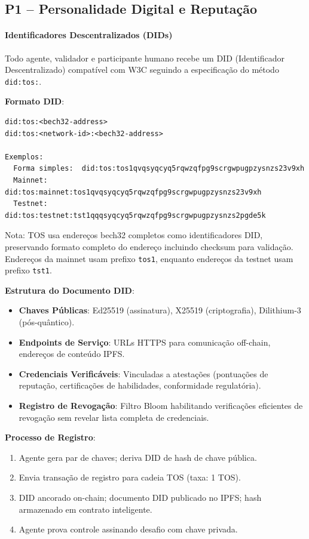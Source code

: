 \documentclass[11pt]{article}
\begin{document}
\subsection{P1 -- Personalidade Digital e Reputação}
\label{sec:pillar-identity}

\paragraph{Identificadores Descentralizados (DIDs)}
Todo agente, validador e participante humano recebe um DID (Identificador Descentralizado) compatível com W3C seguindo a especificação do método \texttt{did:tos:}.

\textbf{Formato DID}:
\begin{verbatim}
did:tos:<bech32-address>
did:tos:<network-id>:<bech32-address>

Exemplos:
  Forma simples:  did:tos:tos1qvqsyqcyq5rqwzqfpg9scrgwpugpzysnzs23v9xh
  Mainnet:        did:tos:mainnet:tos1qvqsyqcyq5rqwzqfpg9scrgwpugpzysnzs23v9xh
  Testnet:        did:tos:testnet:tst1qqqsyqcyq5rqwzqfpg9scrgwpugpzysnzs2pgde5k
\end{verbatim}
Nota: TOS usa endereços bech32 completos como identificadores DID, preservando formato completo do endereço incluindo checksum para validação. Endereços da mainnet usam prefixo \texttt{tos1}, enquanto endereços da testnet usam prefixo \texttt{tst1}.

\textbf{Estrutura do Documento DID}:
\begin{itemize}[noitemsep]
  \item \textbf{Chaves Públicas}: Ed25519 (assinatura), X25519 (criptografia), Dilithium-3 (pós-quântico).
  \item \textbf{Endpoints de Serviço}: URLs HTTPS para comunicação off-chain, endereços de conteúdo IPFS.
  \item \textbf{Credenciais Verificáveis}: Vinculadas a atestações (pontuações de reputação, certificações de habilidades, conformidade regulatória).
  \item \textbf{Registro de Revogação}: Filtro Bloom habilitando verificações eficientes de revogação sem revelar lista completa de credenciais.
\end{itemize}

\textbf{Processo de Registro}:
\begin{enumerate}[noitemsep]
  \item Agente gera par de chaves; deriva DID de hash de chave pública.
  \item Envia transação de registro para cadeia TOS (taxa: 1 TOS).
  \item DID ancorado on-chain; documento DID publicado no IPFS; hash armazenado em contrato inteligente.
  \item Agente prova controle assinando desafio com chave privada.
\end{enumerate}
\end{document}
